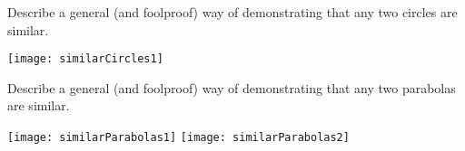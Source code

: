 \documentclass[nooutcomes]{ximera}
\begin{document}
\newpage
\begin{problem}
Describe a general (and foolproof) way of demonstrating that any two circles are 
similar.
\begin{image}
\texttt{[image: similarCircles1]}
\end{image}
\vfill
\end{problem}
\newpage

\begin{problem}
Describe a general (and foolproof) way of demonstrating that any two parabolas are similar. 
\begin{image}
\texttt{[image: similarParabolas1]}
\texttt{[image: similarParabolas2]}
\end{image}
\vfill
\end{problem}
\end{document}
